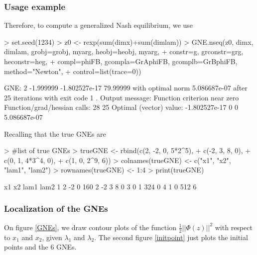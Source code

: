 \documentclass[11pt]{article}
\begin{document}
\subsubsection{Usage example}

Therefore, to compute a generalized Nash equilibrium, we use
\begin{Schunk}
\begin{Sinput}
> set.seed(1234)
> z0 <- rexp(sum(dimx)+sum(dimlam))
> GNE.nseq(z0, dimx, dimlam, grobj=grobj, myarg, heobj=heobj, myarg, 
+ 	constr=g, grconstr=grg, heconstr=heg, 
+ 	compl=phiFB, gcompla=GrAphiFB, gcomplb=GrBphiFB, method="Newton", 
+ 	control=list(trace=0))
\end{Sinput}
\begin{Soutput}
GNE: 2 -1.999999 -1.802527e-17 79.99999 
with optimal norm 5.086687e-07 
after  25 iterations with exit code 1 .
Output message: Function criterion near zero 
Function/grad/hessian calls: 28 25 
Optimal (vector) value: -1.802527e-17 0 0 5.086687e-07 
\end{Soutput}
\end{Schunk}
Recalling that the true GNEs are
\begin{Schunk}
\begin{Sinput}
> #list of true GNEs
> trueGNE <- rbind(c(2, -2, 0, 5*2^5),
+ 	c(-2, 3, 8, 0),
+ 	c(0, 1, 4*3^4, 0),
+ 	c(1, 0, 2^9, 6))
> colnames(trueGNE) <- c("x1", "x2", "lam1", "lam2")
> rownames(trueGNE) <- 1:4
> print(trueGNE)
\end{Sinput}
\begin{Soutput}
  x1 x2 lam1 lam2
1  2 -2    0  160
2 -2  3    8    0
3  0  1  324    0
4  1  0  512    6
\end{Soutput}
\end{Schunk}

\subsubsection{Localization of the GNEs}

On figure \ref{GNEs}, we draw contour plots of the function $\frac{1}{2} || \Phi(z) ||^2$ with respect to $x_1$ and $x_2$, given $\lambda_1$ and $\lambda_2$. The second figure \ref{initpoint} just plots the initial points and the 6 GNEs.
\end{document}
